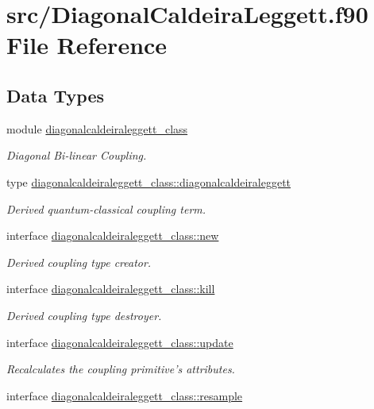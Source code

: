 \hypertarget{_diagonal_caldeira_leggett_8f90}{\section{src/\+Diagonal\+Caldeira\+Leggett.f90 File Reference}
\label{_diagonal_caldeira_leggett_8f90}
}
\subsection*{Data Types}
\begin{DoxyCompactItemize}
\item 
module \hyperlink{classdiagonalcaldeiraleggett__class}{diagonalcaldeiraleggett\+\_\+class}
\begin{DoxyCompactList}\small\item\em Diagonal Bi-\/linear Coupling. \end{DoxyCompactList}\item 
type \hyperlink{structdiagonalcaldeiraleggett__class_1_1diagonalcaldeiraleggett}{diagonalcaldeiraleggett\+\_\+class\+::diagonalcaldeiraleggett}
\begin{DoxyCompactList}\small\item\em Derived quantum-\/classical coupling term. \end{DoxyCompactList}\item 
interface \hyperlink{interfacediagonalcaldeiraleggett__class_1_1new}{diagonalcaldeiraleggett\+\_\+class\+::new}
\begin{DoxyCompactList}\small\item\em Derived coupling type creator. \end{DoxyCompactList}\item 
interface \hyperlink{interfacediagonalcaldeiraleggett__class_1_1kill}{diagonalcaldeiraleggett\+\_\+class\+::kill}
\begin{DoxyCompactList}\small\item\em Derived coupling type destroyer. \end{DoxyCompactList}\item 
interface \hyperlink{interfacediagonalcaldeiraleggett__class_1_1update}{diagonalcaldeiraleggett\+\_\+class\+::update}
\begin{DoxyCompactList}\small\item\em Recalculates the coupling primitive's attributes. \end{DoxyCompactList}\item 
interface \hyperlink{interfacediagonalcaldeiraleggett__class_1_1resample}{diagonalcaldeiraleggett\+\_\+class\+::resample}

\end{DoxyCompactItemize}
